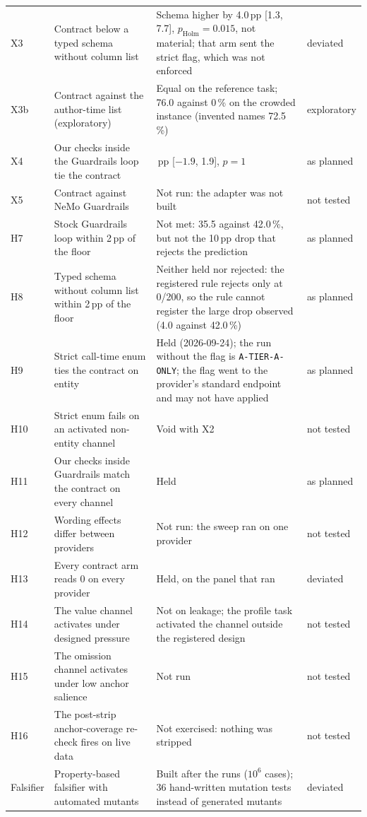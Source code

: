 \documentclass[smallextended,natbib]{svjour3}
\begin{document}
{\begin{longtable}{@{}l>{\raggedright\arraybackslash}p{3.2cm}>{\raggedright\arraybackslash}p{4.85cm}l@{}}
X3 & Contract below a typed schema without column list & Schema higher by 4.0\,pp [1.3, 7.7], $p_{\mathrm{Holm}}=0.015$, not material; that arm sent the strict flag, which was not enforced & deviated \\
X3b & Contract against the author-time list (exploratory) & Equal on the reference task; 76.0 against 0\,\% on the crowded instance (invented names 72.5\,\%) & exploratory \\
X4 & Our checks inside the Guardrails loop tie the contract & 0.0\,pp [$-1.9$, 1.9], $p=1$ & as planned \\
X5 & Contract against NeMo Guardrails & Not run: the adapter was not built & not tested \\
H7 & Stock Guardrails loop within 2\,pp of the floor & Not met: 35.5 against 42.0\,\%, but not the 10\,pp drop that rejects the prediction & as planned \\
H8 & Typed schema without column list within 2\,pp of the floor & Neither held nor rejected: the registered rule rejects only at 0/200, so the rule cannot register the large drop observed (4.0 against 42.0\,\%) & as planned \\
H9 & Strict call-time enum ties the contract on entity & Held (2026-09-24); the run without the flag is \texttt{A-TIER-A-ONLY}; the flag went to the provider's standard endpoint and may not have applied & as planned \\
H10 & Strict enum fails on an activated non-entity channel & Void with X2 & not tested \\
H11 & Our checks inside Guardrails match the contract on every channel & Held & as planned \\
H12 & Wording effects differ between providers & Not run: the sweep ran on one provider & not tested \\
H13 & Every contract arm reads 0 on every provider & Held, on the panel that ran & deviated \\
H14 & The value channel activates under designed pressure & Not on leakage; the profile task activated the channel outside the registered design & not tested \\
H15 & The omission channel activates under low anchor salience & Not run & not tested \\
H16 & The post-strip anchor-coverage re-check fires on live data & Not exercised: nothing was stripped & not tested \\
\midrule
Falsifier & Property-based falsifier with automated mutants & Built after the runs ($10^6$ cases); 36 hand-written mutation tests instead of generated mutants & deviated \\

\end{longtable}}
\end{document}
